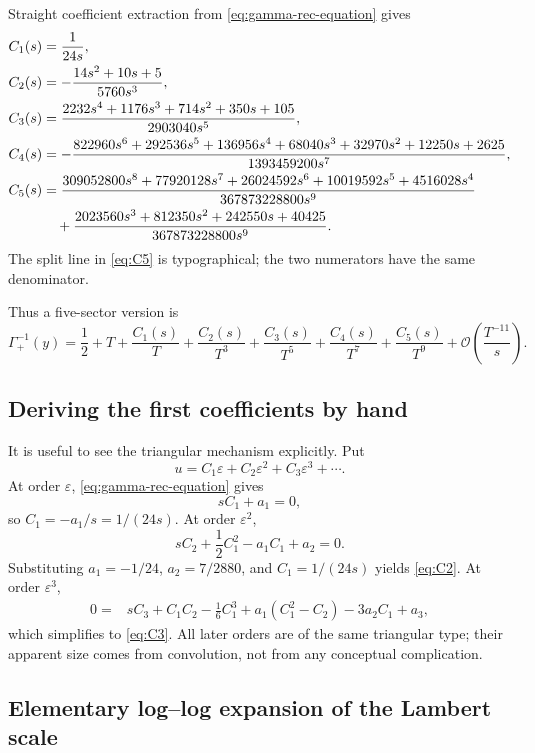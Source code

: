 \documentclass[11pt]{article}
\theoremstyle{definition}
\theoremstyle{remark}
\newcommand{\BigO}{\mathcal O}
\newcommand{\Gaminv}{\Gamma_{+}^{-1}}
\begin{document}
Straight coefficient extraction from \cref{eq:gamma-rec-equation} gives
\begin{align}
 C_1(s)&=\frac{1}{24s},\label{eq:C1}\\
 C_2(s)&=-\frac{14s^2+10s+5}{5760s^3},\label{eq:C2}\\
 C_3(s)&=\frac{2232s^4+1176s^3+714s^2+350s+105}
 {2903040s^5},\label{eq:C3}\\
 C_4(s)&=-\frac{
 822960s^6+292536s^5+136956s^4+68040s^3
 +32970s^2+12250s+2625}
 {1393459200s^7},\label{eq:C4}\\
 C_5(s)&=\frac{
 309052800s^8+77920128s^7+26024592s^6+10019592s^5
 +4516028s^4}
 {367873228800s^9}\notag\\
 &\quad+\frac{
 2023560s^3+812350s^2+242550s+40425}
 {367873228800s^9}.
 \label{eq:C5}
\end{align}
The split line in \cref{eq:C5} is typographical; the two numerators have the same denominator.

Thus a five-sector version is
\begin{equation}\label{eq:gamma-five-sector}
 \Gaminv(y)=\frac12+T+\frac{C_1(s)}{T}
 +\frac{C_2(s)}{T^3}+\frac{C_3(s)}{T^5}
 +\frac{C_4(s)}{T^7}+\frac{C_5(s)}{T^9}
 +\BigO\!\left(\frac{T^{-11}}{s}\right).
\end{equation}

\subsection{Deriving the first coefficients by hand}

It is useful to see the triangular mechanism explicitly.  Put
\[
 u=C_1\varepsilon+C_2\varepsilon^2+C_3\varepsilon^3+\cdots.
\]
At order \(\varepsilon\), \cref{eq:gamma-rec-equation} gives
\[
 sC_1+a_1=0,
\]
so \(C_1=-a_1/s=1/(24s)\).  At order \(\varepsilon^2\),
\[
 sC_2+\frac12C_1^2-a_1C_1+a_2=0.
\]
Substituting \(a_1=-1/24\), \(a_2=7/2880\), and \(C_1=1/(24s)\) yields \cref{eq:C2}.  At order \(\varepsilon^3\),
\[
\begin{split}
0={}&sC_3+C_1C_2-\frac16C_1^3
 +a_1(C_1^2-C_2)-3a_2C_1+a_3,
\end{split}
\]
which simplifies to \cref{eq:C3}.  All later orders are of the same triangular type; their apparent size comes from convolution, not from any conceptual complication.

\subsection{Elementary log--log expansion of the Lambert scale}\label{sec:gamma-loglog}
\end{document}
